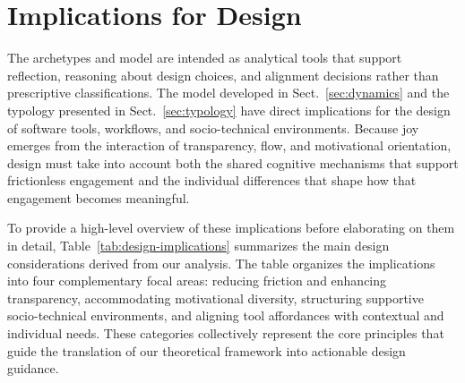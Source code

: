 \documentclass[12pt]{elsarticle}
\begin{document}

\section{Implications for Design}\label{sec:design}
The archetypes and model are intended as analytical tools that support reflection,
reasoning about design choices, and alignment decisions rather than prescriptive
classifications.
The model developed in Sect.~\ref{sec:dynamics} and the typology presented in
Sect.~\ref{sec:typology} have direct implications for the design of software
tools, workflows, and socio-technical environments. Because joy emerges from the
interaction of transparency, flow, and motivational orientation, design must
take into account both the shared cognitive mechanisms that support frictionless
engagement and the individual differences that shape how that engagement becomes
meaningful.

To provide a high-level overview of these implications before elaborating on 
them in detail, Table~\ref{tab:design-implications} summarizes the main design 
considerations derived from our analysis. The table organizes the implications 
into four complementary focal areas: reducing friction and enhancing 
transparency, accommodating motivational diversity, structuring supportive 
socio-technical environments, and aligning tool affordances with contextual and 
individual needs. These categories collectively represent the core principles 
that guide the translation of our theoretical framework into actionable design 
guidance.
\end{document}
